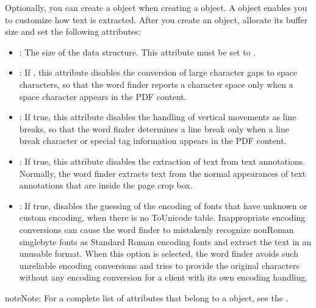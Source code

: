 \documentclass[letterpaper,12pt,english,openany,oneside]{sphinxmanual}
\begin{document}
Optionally, you can create a  object when creating a  object. A  object enables you to customize how text is extracted. After you create an  object, allocate its buffer size and set the following attributes:
\begin{itemize}
\item {} 
: The size of the data structure. This attribute must be set to .

\item {} 
: If , this attribute disables the conversion of large character gaps to space characters, so that the word finder reports a character space only when a space character appears in the PDF content.

\item {} 
: If true, this attribute disables the handling of vertical movements as line breaks, so that the word finder determines a line break only when a line break character or special tag information appears in the PDF content.

\item {} 
: If true, this attribute disables the extraction of text from text annotations. Normally, the word finder extracts text from the normal appearances of text annotations that are inside the page crop box.

\item {} 
: If true, disables the guessing of the encoding of fonts that have unknown or custom encoding, when there is no ToUnicode table. Inappropriate encoding conversions can cause the word finder to mistakenly recognize non\sphinxhyphen{}Roman single\sphinxhyphen{}byte fonts as Standard Roman encoding fonts and extract the text in an unusable format. When this option is selected, the word finder avoids such unreliable encoding conversions and tries to provide the original characters without any encoding conversion for a client with its own encoding handling.

\end{itemize}

\begin{sphinxadmonition}{note}{Note:}
For a complete list of attributes that belong to a  object, see the .
\end{sphinxadmonition}
\end{document}
